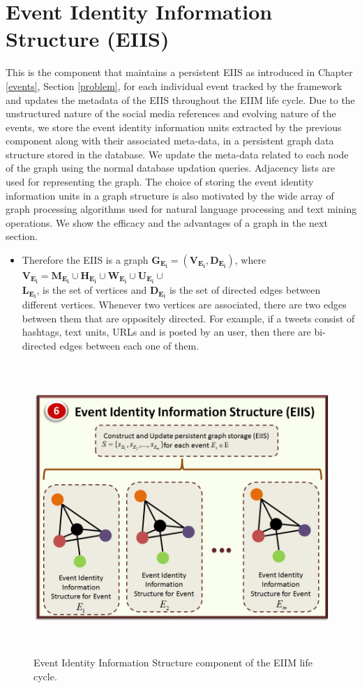 \section{Event Identity Information Structure (EIIS)}
This is the component that maintains a persistent EIIS as introduced in Chapter \ref{events}, Section \ref{problem}, for each individual event tracked by the framework and updates the metadata of the EIIS throughout the EIIM life cycle. Due to the unstructured nature of the social media references and evolving nature of the events, we store the event identity information units extracted by the previous component along with their associated meta-data, in a persistent graph data structure stored in the database. We update the meta-data related to each node of the graph using the normal database updation queries. Adjacency lists are used for representing the graph. The choice of storing the event identity information units in a graph structure is also motivated by the wide array of graph processing algorithms used for natural language processing and text mining operations. We show the efficacy and the advantages of a graph in the next section. 

\begin{itemize}
\item Therefore the EIIS is a graph $\mathbf{G_{E_{i}} = (V_{E_{i}},D_{E_{i}})}$, where $\mathbf{V_{E_{i}} = M_{E_{i}} \cup H_{E_{i}} \cup W_{E_{i}} \cup U_{E_{i}} \cup}$ \\  $\mathbf{L_{E_{i}}}$, is the set of vertices and $\mathbf{D_{E_{i}}}$ is the set of directed edges between different vertices. Whenever two vertices are associated, there are two edges between them that are oppositely directed. For example, if a tweets consist of hashtags, text units, URLs and is posted by an user, then there are bi-directed edges between each one of them. 
\end{itemize}




\begin{figure}[htbp]
  \caption{Event Identity Information Structure component of the EIIM life cycle.}
  \centering
    \includegraphics[width=14cm,height=11cm]{Figures/EIIS.jpg}
\end{figure}


